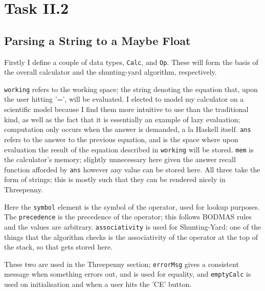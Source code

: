 \documentclass[12pt]{article}
\begin{document}
\section{Task II.2}

\subsection{Parsing a String to a Maybe Float}

Firstly I define a couple of data types, \verb|Calc|, and \verb|Op|. These will form the basis of the overall calculator and the shunting-yard algorithm, respectively.



\verb|working| refers to the working space; the string denoting the equation that, upon the user hitting '=', will be evaluated.
I elected to model my calculator on a scientific model because I find them more intuitive to use than the traditional kind, as well as the fact that it is essentially an example of lazy evaluation; computation only occurs when the answer is demanded, a la Haskell itself.
\verb|ans| refers to the answer to the previous equation, and is the space where upon evaluation the result of the equation described in \verb|working| will be stored.
\verb|mem| is the calculator's memory; slightly unnecessary here given the answer recall function afforded by \verb|ans| however any value can be stored here.
All three take the form of strings; this is mostly such that they can be rendered nicely in Threepenny.



Here the \verb|symbol| element is the symbol of the operator, used for lookup purposes.
The \verb|precedence| is the precedence of the operator; this follows BODMAS rules and the values are arbitrary.
\verb|associativity| is used for Shunting-Yard: one of the things that the algorithm checks is the associativity of the operator at the top of the stack, so that gets stored here.



These two are used in the Threepenny section; \verb|errorMsg| gives a consistent message when something errors out, and is used for equality, and \verb|emptyCalc| is used on initialisation and when a user hits the 'CE' button.


\end{document}
